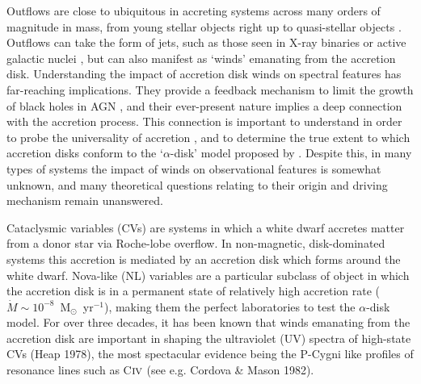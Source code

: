 \documentclass[preprint, a4paper, 11pt]{aastex}
\begin{document}
Outflows are
close to ubiquitous  in accreting systems across many orders of magnitude in mass,
from young stellar objects \citep{bunn1995} right up 
to quasi-stellar objects \citep[QSOs;][]{ganguly2008}. Outflows can take the form of jets, such as those
seen in X-ray binaries \citep{fender2006} or active galactic nuclei \citep[AGN;][]{marscher2006}, but can also manifest as `winds' emanating from
the accretion disk.
Understanding the impact of accretion disk winds on spectral features has far-reaching implications. 
They provide a feedback mechanism to limit the growth of black holes in AGN \citep{silkrees1998},
and their ever-present nature implies a deep connection with the accretion process. This connection
is important to understand in order to probe the universality of accretion \citep{mchardy2006, SKUK2012}, 
and to determine the true extent to which
accretion disks conform to the `$\alpha$-disk' model proposed by 
\cite{shakurasunyaev1973}. 
Despite this, in many types of systems the impact of winds on observational
features is somewhat unknown, and many theoretical questions relating to their origin 
and driving mechanism remain unanswered.

Cataclysmic variables (CVs) are systems in which a white dwarf accretes matter from a donor
star via Roche-lobe overflow. In non-magnetic, disk-dominated systems this accretion
is mediated by an accretion disk which forms around the white dwarf. 
Nova-like (NL) variables are a particular subclass of object in which the accretion disk
is in a permanent state of relatively high accretion rate 
($\dot{M} \sim 10^{-8}$~M$_{\odot}$~yr$^{-1}$),
making them the perfect laboratories to test the $\alpha$-disk model.
For over three decades, it has been known that winds emanating from the accretion disk
are important in shaping the ultraviolet (UV) spectra of high-state CVs (Heap 1978), 
the most spectacular evidence being the P-Cygni like profiles of resonance lines such as 
C${\textsc {iv}}$ (see e.g. Cordova \& Mason 1982\nocite{cordova1982}).
\end{document}
